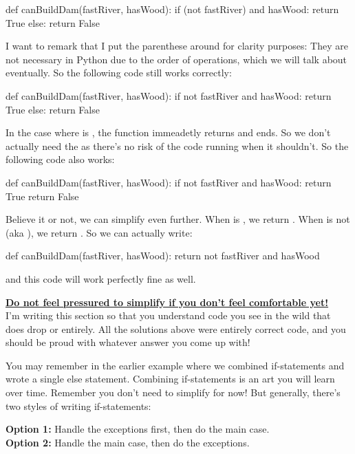 \documentclass[12pt]{scrartcl}
\newcommand{\pyTrue}[1][]{\pythonl[fontsize=#1]{True}\xspace}
\newcommand{\pyFalse}[1][]{\pythonl[fontsize=#1]{False}\xspace}
\begin{document}
\begin{python}
    def canBuildDam(fastRiver, hasWood):
        if (not fastRiver) and hasWood:
            return True
        else:
            return False
\end{python}

I want to remark that I put the parenthese around  for clarity purposes: They are not necessary in Python due to the order of operations, which we will talk about eventually. So the following code still works correctly:

\begin{python}
    def canBuildDam(fastRiver, hasWood):
        if not fastRiver and hasWood:
            return True
        else:
            return False
\end{python}

In the case where  is \pyTrue, the function immeadetly returns \pyTrue and ends. So we don't actually need the  as there's no risk of the  code running when it shouldn't. So the following code also works:

\begin{python}
    def canBuildDam(fastRiver, hasWood):
        if not fastRiver and hasWood:
            return True
        return False
\end{python}

Believe it or not, we can simplify even further. When  is \pyTrue, we return \pyTrue. When  is not \pyTrue (aka \pyFalse), we return \pyFalse. So we can actually write:

\begin{python}
    def canBuildDam(fastRiver, hasWood):
        return not fastRiver and hasWood
\end{python}

and this code will work perfectly fine as well.

\textbf{\underline{Do not feel pressured to simplify if you don't feel comfortable yet!}} \\ I'm writing this section so that you understand code you see in the wild that does drop  or  entirely. All the solutions above were entirely correct code, and you should be proud with whatever answer you come up with!

You may remember in the earlier example where we combined if-statements and wrote a single else statement. Combining if-statements is an art you will learn over time. Remember you don't need to simplify for now! But generally, there's two styles of writing if-statements:
\begin{callout}
    \textbf{Option 1:} Handle the exceptions first, then do the main case. \\
    \textbf{Option 2:} Handle the main case, then do the exceptions.
\end{callout}
\end{document}
